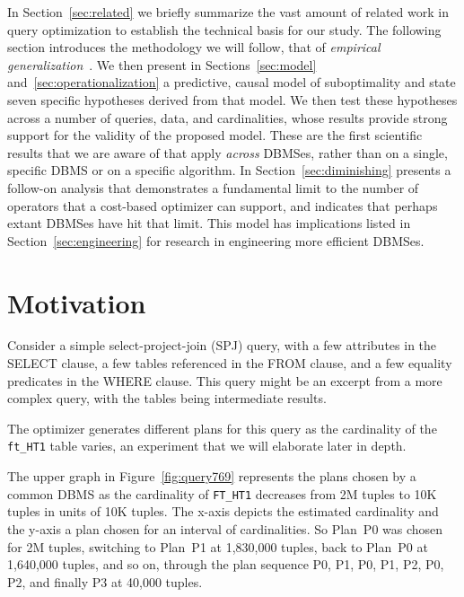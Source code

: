 \documentclass[prodmode,acmtods]{acmsmall}
\begin{document}
In Section~\ref{sec:related} we briefly summarize the vast amount of related
work in query optimization to establish the technical basis for our study.
The following section introduces the methodology we will follow, that of
{\em empirical generalization}~\cite{cohenbook}. We then present in
Sections~\ref{sec:model} and~\ref{sec:operationalization} a predictive,
causal model of suboptimality and state seven specific hypotheses derived
from that model. We then test these hypotheses across a number of queries,
data, and cardinalities, whose results provide strong support for the
validity of the proposed model.  These are the first scientific results that
we are aware of that apply {\em across} \hbox{DBMSes}, rather than on a
single, specific \hbox{DBMS} or on a specific algorithm. In
Section~\ref{sec:diminishing} presents a follow-on analysis that
demonstrates a fundamental limit to the number of operators that a
cost-based optimizer can support, and indicates that perhaps extant DBMSes
have hit that limit. This model has implications listed in
Section~\ref{sec:engineering} for research in engineering more efficient
\hbox{DBMSes}.

\section{Motivation}\label{sec:motivation}

Consider a simple select-project-join (SPJ) query, with a few attributes in
the SELECT clause, a few tables referenced in the FROM clause,
and a few equality predicates in the WHERE clause. This query might be an
excerpt from a more complex query, with the tables being intermediate
results.

\noindent
\hspace{3ex}{\small\begin{verbatim}
        SELECT t0.id1, t0.id2, t2.id4, t1.id1 
        FROM ft_HT3 t2, ft_HT2 t1, ft_HT1 t0 
        WHERE (t2.id4=t1.id1 AND t2.id1=t0.id1)
\end{verbatim}
}

\noindent
The optimizer generates
different plans for this query as the cardinality of the {\tt
  ft\_HT1} table varies, an experiment that we will elaborate later in depth.

The upper graph in Figure~\ref{fig:query769} represents the plans chosen by
a common DBMS as the cardinality of {\tt FT\_HT1} decreases from 2M tuples
to 10K tuples in units of 10K tuples. The \hbox{x-axis} depicts the estimated
cardinality and the y-axis  a plan chosen for an interval of
cardinalities. So Plan~P0 was chosen for 2M tuples, switching to Plan~P1 at
1,830,000 tuples, back to Plan~P0 at 1,640,000 tuples, and so on, through
the plan
sequence P0, P1, P0, P1, P2, P0, P2, and finally P3 at 40,000 tuples.
\end{document}
